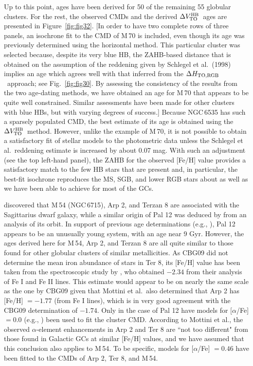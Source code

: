 \documentclass[12pt,preprint]{aastex}
\newcommand\delv{\Delta V^{\rm HB}_{\rm TO}}
\newcommand\delc{\Delta H_{\rm TO,RGB}}
\begin{document}
Up to this point, ages have been derived for 50 of the remaining 55 globular
clusters.  For the rest, the observed CMDs and the derived $\delv$\ ages are
presented in Figure~\ref{fig:fig32}.  [In order to have two complete rows of
three panels, an isochrone fit to the CMD of M$\,$70 is included, even
though its age was previously determined using the horizontal method.  This
particular cluster was selected because, despite its very blue HB, the
ZAHB-based distance that is obtained on the assumption of the reddening given
by Schlegel et al.~(1998) implies an age which agrees well with that inferred
from the $\delc$\ approach; see Fig.~\ref{fig:fig30}.  By assessing the
consistency of the results from the two age-dating methods, we have obtained
an age for M$\,$70 that appears to be quite well constrained.  Similar 
assessments have been made for other clusters with blue HBs, but with varying
degrees of success.]  Because NGC$\,$6535 has such a sparsely populated CMD,
the best estimate of its age is obtained using the $\delv$\ method.  However,
unlike the example of M$\,$70, it is not possible to obtain a satisfactory
fit of stellar models to the photometric data unless the Schlegel et
al.~reddening estimate is increased by about 0.07 mag.  With such an adjustment
(see the top left-hand panel), the ZAHB for the observed [Fe/H] value provides
a satisfactory match to the few HB stars that are present and, in particular,
the best-fit isochrone reproduces the MS, SGB, and lower RGB stars about as
well as we have been able to achieve for most of the GCs.

\citet{igi95} discovered that M$\,$54 (NGC$\,$6715), Arp 2, and Terzan 8 are
associated with the Sagittarius dwarf galaxy, while a similar origin of Pal 12
was deduced by \citet{dmg00} from an analysis of its orbit.  In support of
previous age determinations (e.g., \citealt{van00}), Pal 12 appears to be an
unusually young system, with an age near 9 Gyr.  However, the ages derived here
for M$\,$54, Arp 2, and Terzan 8 are all quite similar to those found for other
globular clusters of similar metallicities.  As CBG09 did not determine the
mean iron abundance of stars in Ter 8, its [Fe/H] value has been taken from the
spectroscopic study by \citet{mwm08}, who obtained $-2.34$ from their analysis
of Fe I and Fe II lines.  This estimate would appear to be on nearly the same
scale as the one by CBG09 given that Mottini et al.~also determined that Arp 2
has [Fe/H] $= -1.77$ (from Fe I lines), which is in very good agreement with the
CBG09 determination of $-1.74$.  Only in the case of Pal 12 have models for
[$\alpha$/Fe] $= 0.0$ (e.g., \citealt{bwz97}) been used to fit the cluster CMD.
According to Mottini et al., the observed $\alpha$-element enhancements in
Arp 2 and Ter 8 are ``not too different" from those found in Galactic GCs at
similar [Fe/H] values, and we have assumed that this conclusion also applies to
M$\,$54.  To be specific, models for [$\alpha$/Fe] $=0.46$ have been fitted to
the CMDs of Arp 2, Ter 8, and M$\,$54. 
\end{document}
